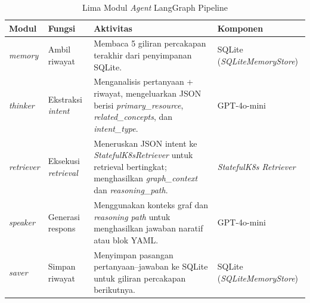 \renewcommand{\arraystretch}{1.3}
\captionsetup[table]{justification=raggedright,singlelinecheck=false}
\begin{table}[H]
\caption{Lima Modul \textit{Agent} LangGraph Pipeline}
\label{tbl:langgraph_nodes}
\centering
\begin{tabular}{|p{}|p{}|p{}|p{}|}
\hline
\textbf{Modul} & \textbf{Fungsi} & \textbf{Aktivitas} & \textbf{Komponen} \\
\hline
\textit{memory} & Ambil riwayat & Membaca 5 giliran percakapan terakhir dari penyimpanan SQLite. & SQLite (\textit{SQLiteMemoryStore}) \\
\hline
\textit{thinker} & Ekstraksi \textit{intent} & Menganalisis pertanyaan + riwayat, mengeluarkan JSON berisi \textit{primary\_resource}, \textit{related\_concepts}, dan \textit{intent\_type}. & GPT-4o-mini \\
\hline
\textit{retriever} & Eksekusi \textit{retrieval} & Meneruskan JSON intent ke \textit{StatefulK8sRetriever} untuk retrieval bertingkat; menghasilkan \textit{graph\_context} dan \textit{reasoning\_path}. & \textit{StatefulK8s Retriever} \\
\hline
\textit{speaker} & Generasi respons & Menggunakan konteks graf dan \textit{reasoning path} untuk menghasilkan jawaban naratif atau blok YAML. & GPT-4o-mini \\
\hline
\textit{saver} & Simpan riwayat & Menyimpan pasangan pertanyaan--jawaban ke SQLite untuk giliran percakapan berikutnya. & SQLite (\textit{SQLiteMemoryStore}) \\
\hline
\end{tabular}
\end{table}